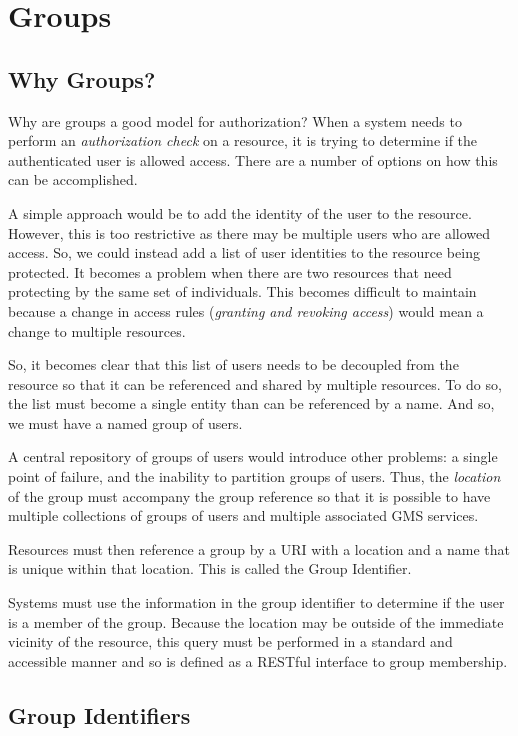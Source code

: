 \documentclass[11pt,a4paper]{ivoa}
\begin{document}
\section{Groups}

\subsection{Why Groups?}

Why are groups a good model for authorization?  When a system needs to perform an \emph{authorization check} on a resource, it is trying to determine if the authenticated user is allowed access.  There are a number of options on how this can be accomplished.

A simple approach would be to add the identity of the user to the resource.  However, this is too restrictive as there may be multiple users who are allowed access.  So, we could instead add a list of user identities to the resource being protected.  It becomes a problem when there are two resources that need protecting by the same set of individuals.  This becomes difficult to maintain because a change in access rules (\emph{granting and revoking access}) would mean a change to multiple resources.

So, it becomes clear that this list of users needs to be decoupled from the resource so that it can be referenced and shared by multiple resources.  To do so, the list must become a single entity than can be referenced by a name.  And so, we must have a named group of users.

A central repository of groups of users would introduce other problems:  a single point of failure, and the inability to partition groups of users.  Thus, the \emph{location} of the group must accompany the group reference so that it is possible to have multiple collections of groups of users and multiple associated GMS services.

Resources must then reference a group by a URI with a location and a name that is unique within that location.  This is called the Group Identifier.

Systems must use the information in the group identifier to determine if the user is a member of the group.  Because the location may be outside of the immediate vicinity of the resource, this query must be performed in a standard and accessible manner and so is defined as a RESTful interface to group membership.

\subsection{Group Identifiers}
\end{document}
